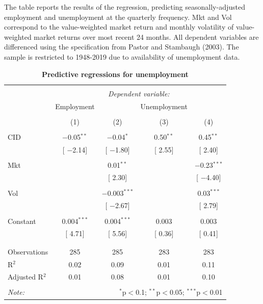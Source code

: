 \documentclass[12pt]{article}
\begin{document}
\begin{table}[!htbp] \centering 
  \caption{\textbf{Predictive regressions for unemployment}}
  \label{} 
      \begin{flushleft}
    {\medskip\small
 The table reports the results of the regression, predicting seasonally-adjusted employment and unemployment at the quarterly frequency. Mkt and Vol correspond to the value-weighted market return and monthly volatility of value-weighted market returns over most recent 24 months. All dependent variables are differenced using the specification from Pastor and Stambaugh (2003). The sample is restricted to 1948-2019 due to availability of unemployment data.}
    \medskip
    \end{flushleft}
\begin{tabular}{@{\extracolsep{5pt}}lcccc} 
\\[-1.8ex]\hline 
\hline \\[-1.8ex] 
 & \multicolumn{4}{c}{\textit{Dependent variable:}} \\ 
\cline{2-5} 
 & Employment &  & Unemployment &  \\ 
\\[-1.8ex] & (1) & (2) & (3) & (4)\\ 
\hline \\[-1.8ex] 
 CID & $-$0.05$^{**}$ & $-$0.04$^{*}$ & 0.50$^{**}$ & 0.45$^{**}$ \\ 
  & [ $-$2.14] & [ $-$1.80] & [ 2.55] & [ 2.40] \\ 
  & & & & \\ 
 Mkt &  & 0.01$^{**}$ &  & $-$0.23$^{***}$ \\ 
  &  & [ 2.30] &  & [ $-$4.40] \\ 
  & & & & \\ 
 Vol &  & $-$0.003$^{***}$ &  & 0.03$^{***}$ \\ 
  &  & [ $-$2.67] &  & [ 2.79] \\ 
  & & & & \\ 
 Constant & 0.004$^{***}$ & 0.004$^{***}$ & 0.003 & 0.003 \\ 
  & [ 4.71] & [ 5.56] & [ 0.36] & [ 0.41] \\ 
  & & & & \\ 
\hline \\[-1.8ex] 
Observations & 285 & 285 & 283 & 283 \\ 
R$^{2}$ & 0.02 & 0.09 & 0.01 & 0.11 \\ 
Adjusted R$^{2}$ & 0.01 & 0.08 & 0.01 & 0.10 \\ 
\hline 
\hline \\[-1.8ex] 
\textit{Note:}  & \multicolumn{4}{r}{$^{*}$p$<$0.1; $^{**}$p$<$0.05; $^{***}$p$<$0.01} \\ 
\end{tabular} 
\end{table}
\end{document}
